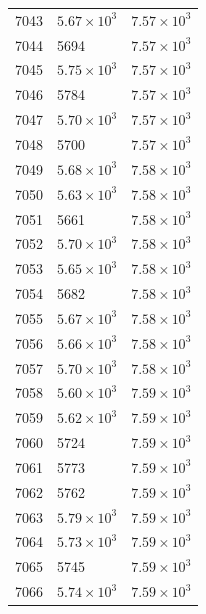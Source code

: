 \begin{table}[H]
\begin{tabular}{lll}
7043 & $\displaystyle 5.67 \times 10^{3}$ & $\displaystyle 7.57 \times 10^{3}$ \\
7044 & 5694 & $\displaystyle 7.57 \times 10^{3}$ \\
7045 & $\displaystyle 5.75 \times 10^{3}$ & $\displaystyle 7.57 \times 10^{3}$ \\
7046 & 5784 & $\displaystyle 7.57 \times 10^{3}$ \\
7047 & $\displaystyle 5.70 \times 10^{3}$ & $\displaystyle 7.57 \times 10^{3}$ \\
7048 & 5700 & $\displaystyle 7.57 \times 10^{3}$ \\
7049 & $\displaystyle 5.68 \times 10^{3}$ & $\displaystyle 7.58 \times 10^{3}$ \\
7050 & $\displaystyle 5.63 \times 10^{3}$ & $\displaystyle 7.58 \times 10^{3}$ \\
7051 & 5661 & $\displaystyle 7.58 \times 10^{3}$ \\
7052 & $\displaystyle 5.70 \times 10^{3}$ & $\displaystyle 7.58 \times 10^{3}$ \\
7053 & $\displaystyle 5.65 \times 10^{3}$ & $\displaystyle 7.58 \times 10^{3}$ \\
7054 & 5682 & $\displaystyle 7.58 \times 10^{3}$ \\
7055 & $\displaystyle 5.67 \times 10^{3}$ & $\displaystyle 7.58 \times 10^{3}$ \\
7056 & $\displaystyle 5.66 \times 10^{3}$ & $\displaystyle 7.58 \times 10^{3}$ \\
7057 & $\displaystyle 5.70 \times 10^{3}$ & $\displaystyle 7.58 \times 10^{3}$ \\
7058 & $\displaystyle 5.60 \times 10^{3}$ & $\displaystyle 7.59 \times 10^{3}$ \\
7059 & $\displaystyle 5.62 \times 10^{3}$ & $\displaystyle 7.59 \times 10^{3}$ \\
7060 & 5724 & $\displaystyle 7.59 \times 10^{3}$ \\
7061 & 5773 & $\displaystyle 7.59 \times 10^{3}$ \\
7062 & 5762 & $\displaystyle 7.59 \times 10^{3}$ \\
7063 & $\displaystyle 5.79 \times 10^{3}$ & $\displaystyle 7.59 \times 10^{3}$ \\
7064 & $\displaystyle 5.73 \times 10^{3}$ & $\displaystyle 7.59 \times 10^{3}$ \\
7065 & 5745 & $\displaystyle 7.59 \times 10^{3}$ \\
7066 & $\displaystyle 5.74 \times 10^{3}$ & $\displaystyle 7.59 \times 10^{3}$ \\

\end{tabular}
\end{table}
